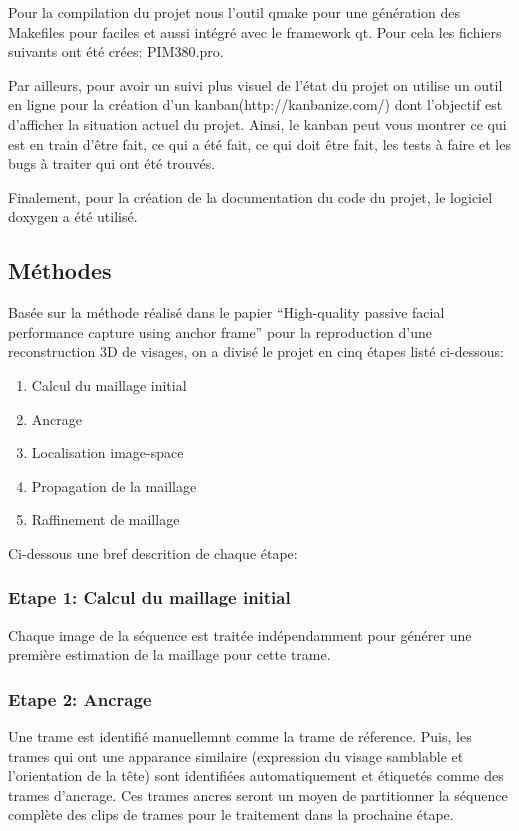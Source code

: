 \documentclass[a4paper,12pt]{article}
\begin{document}
Pour la compilation du projet nous l’outil qmake
pour une génération des Makefiles pour faciles et aussi intégré avec
le framework qt.  
Pour cela les fichiers suivants ont été crées: PIM380.pro. 

Par ailleurs, pour avoir un suivi plus visuel de l’état du projet on
utilise un outil en ligne pour la création d’un
kanban(http://kanbanize.com/) dont l’objectif est d’afficher la
situation actuel du projet. Ainsi, le kanban peut vous montrer ce qui
est en train d’être fait, ce qui a été fait, ce qui doit être fait,
les tests à faire et les bugs à traiter qui ont été trouvés. 

Finalement, pour la création de la documentation du code du projet, le
logiciel doxygen a été utilisé.  


\subsection{Méthodes}

Basée sur la méthode réalisé dans le papier ``High-quality passive
facial performance capture using anchor
frame''\cite{Beeler:2011:HPF:2010324.1964970} pour la reproduction
d'une reconstruction 3D de visages, on a divisé le projet en cinq
étapes listé ci-dessous: 

\begin{enumerate}
\item Calcul du maillage initial
\item Ancrage
\item Localisation image-space
\item Propagation de la maillage
\item Raffinement de maillage
\end{enumerate}

Ci-dessous une bref descrition de chaque étape:

\subsubsection*{Etape 1: Calcul du maillage initial}
Chaque image de la séquence est traitée indépendamment pour générer
une première estimation de la maillage pour cette trame. 

\subsubsection*{Etape 2: Ancrage}
Une trame est identifié manuellemnt comme la trame de réference. Puis,
les trames qui ont une apparance similaire (expression du visage
samblable et l'orientation de la tête) sont identifiées
automatiquement et étiquetés comme des trames d'ancrage. Ces trames
ancres seront un moyen de partitionner la séquence complète des clips
de trames pour le traitement dans la prochaine étape. 
\end{document}
